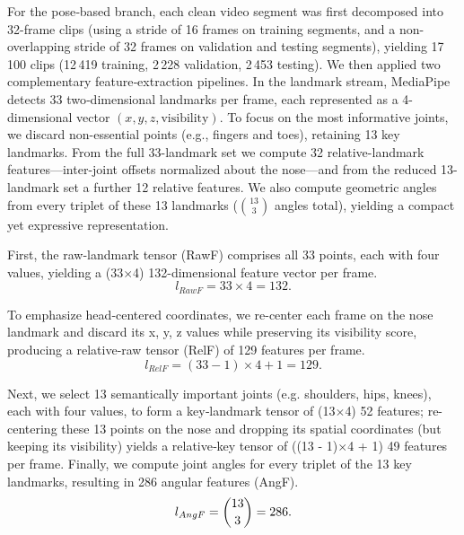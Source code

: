 \documentclass[runningheads]{llncs}
\begin{document}
For the pose‐based branch, each clean video segment was first decomposed into 32-frame clips (using a stride of 16 frames on training segments, and a non-overlapping stride of 32 frames on validation and testing segments), yielding 17\,100 clips (12\,419 training, 2\,228 validation, 2\,453 testing). 
We then applied two complementary feature‐extraction pipelines. In the landmark stream, MediaPipe detects 33 two‐dimensional landmarks per frame, each represented as a 4-dimensional vector $(x, y, z, \text{visibility})$. To focus on the most informative joints, we discard non-essential points (e.g., fingers and toes), retaining 13 key landmarks. From the full 33-landmark set we compute 32 relative-landmark features—inter-joint offsets normalized about the nose—and from the reduced 13-landmark set a further 12 relative features. 
We also compute geometric angles from every triplet of these 13 landmarks ($\binom{13}{3}$ angles total), yielding a compact yet expressive representation.

First, the raw‐landmark tensor (RawF) comprises all 33 points, each with four values, yielding a (33$\times$4) 132-dimensional feature vector per frame.
\begin{equation}
    l_{RawF} = 33 \times 4 = 132.
\end{equation}

To emphasize head‐centered coordinates, we re-center each frame on the nose landmark and discard its x, y, z values while preserving its visibility score, producing a relative‐raw tensor (RelF) of 129 features per frame.
\begin{equation}
    l_{RelF} = (33 - 1)\times4 + 1 = 129.
\end{equation}

Next, we select 13 semantically important joints (e.g. shoulders, hips, knees), each with four values, to form a key‐landmark tensor of (13$\times$4) 52 features; re-centering these 13 points on the nose and dropping its spatial coordinates (but keeping its visibility) yields a relative‐key tensor of ((13 - 1)$\times$4 + 1) 49 features per frame. Finally, we compute joint angles for every triplet of the 13 key landmarks, resulting in 286 angular features (AngF).
\begin{equation}
    l_{AngF} = \dbinom{13}{3} = 286.
\end{equation}
\end{document}
